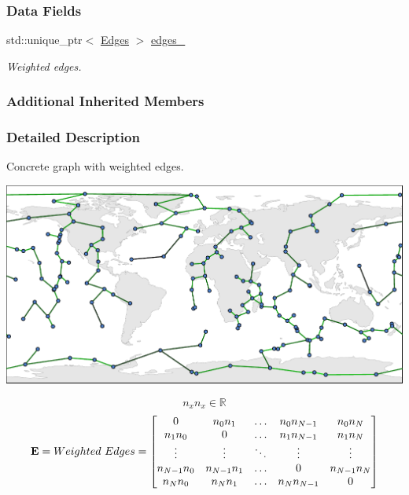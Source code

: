 \subsubsection*{Data Fields}
\begin{DoxyCompactItemize}
\item 
\mbox{\label{classosse_1_1collaborate_1_1_graph_weighted_a60944e002d7910e9de5d2bba3ea87e74}} 
std\+::unique\+\_\+ptr$<$ \hyperlink{classosse_1_1collaborate_1_1_graph_weighted_aa604a648e701d85c8deb818f13b64097}{Edges} $>$ \hyperlink{classosse_1_1collaborate_1_1_graph_weighted_a60944e002d7910e9de5d2bba3ea87e74}{edges\+\_\+}
\begin{DoxyCompactList}\small\item\em Weighted edges. \end{DoxyCompactList}\end{DoxyCompactItemize}
\subsubsection*{Additional Inherited Members}


\subsubsection{Detailed Description}
Concrete graph with weighted edges. 

 
\begin{DoxyImageNoCaption}
  \mbox{\includegraphics[width=\textwidth]{weighted}}
\end{DoxyImageNoCaption}


\[ n_x n_x \in \mathbb{R} \] \[ {\bf{E}} = Weighted~Edges = \begin{bmatrix} 0 & n_0 n_1 & \dots & n_0 n_{N-1} & n_0 n_N \\ n_1 n_0 & 0 & \dots & n_1 n_{N-1} & n_1 n_N \\ \vdots & \vdots & \ddots & \vdots & \vdots \\ n_{N-1} n_0 & n_{N-1} n_1 & \dots & 0 & n_{N-1} n_N \\ n_N n_0 & n_N n_1 & \dots & n_N n_{N-1} & 0 \end{bmatrix} \] 

